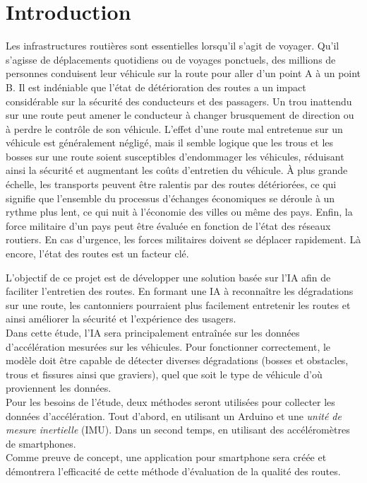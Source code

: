 \section{Introduction}
Les infrastructures routières sont essentielles lorsqu'il s'agit de voyager. Qu'il s'agisse de déplacements quotidiens ou de voyages ponctuels, des millions de personnes conduisent leur véhicule sur la route pour aller d'un point A à un point B. Il est indéniable que l'état de détérioration des routes a un impact considérable sur la sécurité des conducteurs et des passagers. Un trou inattendu sur une route peut amener le conducteur à changer brusquement de direction ou à perdre le contrôle de son véhicule. L'effet d'une route mal entretenue sur un véhicule est généralement négligé, mais il semble logique que les trous et les bosses sur une route soient susceptibles d'endommager les véhicules, réduisant ainsi la sécurité et augmentant les coûts d'entretien du véhicule. À plus grande échelle, les transports peuvent être ralentis par des routes détériorées, ce qui signifie que l'ensemble du processus d'échanges économiques se déroule à un rythme plus lent, ce qui nuit à l'économie des villes ou même des pays. Enfin, la force militaire d'un pays peut être évaluée en fonction de l'état des réseaux routiers. En cas d'urgence, les forces militaires doivent se déplacer rapidement. Là encore, l'état des routes est un facteur clé.

L'objectif de ce projet est de développer une solution basée sur l'IA afin de faciliter l'entretien des routes. En formant une IA à reconnaître les dégradations sur une route, les cantonniers pourraient plus facilement entretenir les routes et ainsi améliorer la sécurité et l'expérience des usagers.\\
Dans cette étude, l'IA sera principalement entraînée sur les données d'accélération mesurées sur les véhicules. Pour fonctionner correctement, le modèle doit être capable de détecter diverses dégradations (bosses et obstacles, trous et fissures ainsi que graviers), quel que soit le type de véhicule d'où proviennent les données.\\
Pour les besoins de l'étude, deux méthodes seront utilisées pour collecter les données d'accélération. Tout d'abord, en utilisant un Arduino et une \textit{unité de mesure inertielle} (IMU). Dans un second temps, en utilisant des accéléromètres de smartphones.\\
Comme preuve de concept, une application pour smartphone sera créée et démontrera l'efficacité de cette méthode d'évaluation de la qualité des routes.